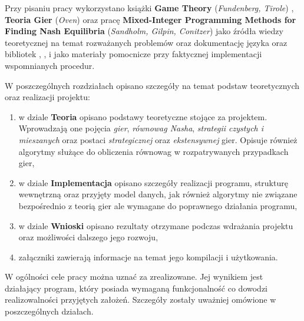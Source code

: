 \documentclass[polish]{standalone}
\begin{document}
Przy pisaniu pracy wykorzystano książki \textbf{Game Theory} (\textit{Fundenberg, Tirole}) \cite{FT-GT},
\textbf{Teoria Gier} (\textit{Oven}) \cite{O-GT} oraz pracę \textbf{Mixed-Integer Programming Methods for Finding Nash
Equilibria} (\textit{Sandholm, Gilpin, Conitzer}) \cite{SCG-NE} jako źródła wiedzy teoretycznej na temat rozważanych
problemów oraz dokumentację języka  oraz bibliotek , ,  i  jako
materiały pomocnicze przy faktycznej implementacji wspomnianych procedur.

W poszczególnych rozdziałach opisano szczegóły na temat podstaw teoretycznych oraz realizacji projektu:
\begin{enumerate}
\item w dziale \textbf{Teoria} opisano podstawy teoretyczne stojące za projektem. Wprowadzają one pojęcia \textit{gier},
\textit{równowag Nasha},
\textit{strategii czystych i mieszanych} oraz postaci \textit{strategicznej} oraz \textit{ekstensywnej} gier. Opisuje
również algorytmy służące do obliczenia równowag w rozpatrywanych przypadkach gier,
\item w dziale \textbf{Implementacja} opisano szczegóły realizacji programu, strukturę wewnętrzną oraz przyjęty model
danych, jak również algorytmy nie związane bezpośrednio z teorią gier ale wymagane do poprawnego działania programu,
\item w dziale \textbf{Wnioski} opisano rezultaty otrzymane podczas wdrażania projektu oraz możliwości dalszego jego
rozwoju,
\item załączniki zawierają informacje na temat jego kompilacji i użytkowania.
\end{enumerate}

W ogólności cele pracy można uznać za zrealizowane. Jej wynikiem jest działający program, który posiada wymaganą
funkcjonalność co dowodzi realizowalności przyjętych założeń. Szczegóły zostały uważniej omówione w poszczególnych
działach.
\end{document}
